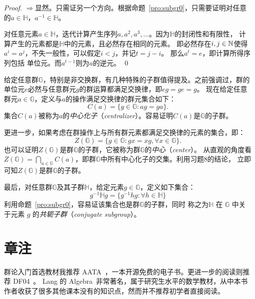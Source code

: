 \begin{proof}
$\Rightarrow$显然。只需证另一个方向。根据命题~\ref{pro:subgr0}，只需要证明对任意的$a\in \mathbb{H}$，$a^{-1}\in \mathbb{H}$。

对任意元素$a \in \mathbb{H}$，迭代计算产生序列$a, a^2, a^3, \ldots$。因为$\mathbb{H}$的封闭性和有限性，
计算产生的元素都是$\mathbb{H}$中的元素，且必然存在相同的元素。
即必然存在$i, j \in {\mathbb N}$使得$a^i = a^j$，不失一般性，可以假定$i < j$，并记$t = j - i$。
那么$a^t = e$，即计算所得序列包括
单位元。而$a^{t -1}$则为$a$的逆元。%
\qed
\end{proof}

给定任意群$\mathbb{G}$，特别是非交换群，有几种特殊的子群值得提及。之前强调过，群的单位元$e$必然与任意群元$g$的群运算都满足交换律，即$eg = ge = g$。
现在给定任意群元$a \in \mathbb{G}$，定义与$a$的操作满足交换律的群元集合如下：
\[C(a) = \{ g \in \mathbb{G}: a g = g a\}.\]
集合$C(a)$被称为$a$的\emph{中心化子}（\emph{centralizer}）。容易证明$C(a)$是$\mathbb{G}$的子群。

更进一步，如果考虑在群操作上与所有群元素都满足交换律的元素的集合，即：
\[Z(\mathbb{G}) = \{ g \in \mathbb{G}: g x = x g, \forall x \in \mathbb{G}\}.\]
也可以证明$Z(\mathbb{G})$是群$\mathbb{G}$的子群，它被称为群$\mathbb{G}$的\emph{中心}（\emph{center}）。
从直观的角度看$Z(\mathbb{G}) = \bigcap_{a\in \mathbb{G}} C(a)$，即群$\mathbb{G}$中所有中心化子的交集。利用习题8的结论，
立即可知$Z(\mathbb{G})$是群$\mathbb{G}$的子群。

最后，对任意群$\mathbb{G}$及其子群$\mathbb{H}$，给定元素$g \in \mathbb{G}$，定义如下集合：
\[ g^{-1} \mathbb{H} g = \{ g^{-1} h g : \forall h \in \mathbb{H}\} \]
利用命题~\ref{pro:subgr0}，容易证该集合也是群$\mathbb{G}$的子群，同时
称之为$\mathbb{H}$ 在 $\mathbb{G}$ 中关于元素 $g$ 的\emph{共轭子群}（\emph{conjugate subgroup}）。

\section*{章注}
群论入门首选教材我推荐 AATA~\cite{judson2020abstract}，一本开源免费的电子书。更进一步的阅读则推荐 DF04~\cite{DF04}。
Lang 的 Algebra~\cite{Lang12}非常著名，属于研究生水平的数学教材，从中本书作者收获了很多其他课本没有的知识点，然而并不推荐初学者直接阅读。

